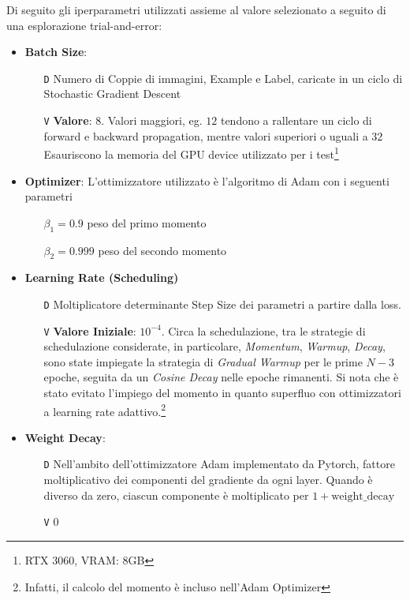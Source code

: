 \documentclass[a4paper,10pt,twocolumn]{article}
\begin{document}
Di seguito gli iperparametri utilizzati assieme al valore selezionato a seguito di una esplorazione trial-and-error:
\begin{itemize}[topsep=5pt, itemsep=7pt]
  \item \textbf{Batch Size}:
    \begin{itemize}[topsep=0pt, noitemsep]
      \item[\texttt{D}] Numero di Coppie di immagini, Example e Label, caricate in un ciclo di Stochastic Gradient Descent
      \item[\texttt{V}] \textbf{Valore}: $8$. Valori maggiori, eg. $12$ tendono a rallentare un ciclo di forward e backward propagation,
        mentre valori superiori o uguali a $32$ Esauriscono la
        memoria del GPU device utilizzato per i test\footnote{RTX 3060, VRAM: 8GB}
    \end{itemize}

  \item
    \textbf{Optimizer}: L'ottimizzatore utilizzato \`e l'algoritmo di Adam\cite{kingma2017adammethodstochasticoptimization} con i seguenti parametri
    \begin{itemize}[topsep=0pt, noitemsep]
      \item[] $\beta_1 = 0.9$ peso del primo momento
      \item[] $\beta_2 = 0.999$ peso del secondo momento
    \end{itemize}

  \item
    \textbf{Learning Rate (Scheduling)}
    \begin{itemize}[topsep=0pt, noitemsep]
      \item[\texttt{D}] Moltiplicatore determinante Step Size dei parametri a partire dalla loss.
      \item[\texttt{V}] \textbf{Valore Iniziale}: $10^{-4}$. Circa la schedulazione, tra le strategie di schedulazione considerate,
        in particolare, \textit{Momentum}, \textit{Warmup}, \textit{Decay}, sono state impiegate la strategia di \textit{Gradual Warmup}
        per le prime $N - 3$ epoche, seguita da un \textit{Cosine Decay} nelle
        epoche rimanenti. Si nota che \`e stato evitato l'impiego del momento in quanto superfluo con ottimizzatori a learning
        rate adattivo.\footnote{Infatti, il calcolo del momento \`e incluso nell'Adam Optimizer}
    \end{itemize}

  \item
    \textbf{Weight Decay}:
    \begin{itemize}[topsep=0pt, noitemsep]
      \item[\texttt{D}] Nell'ambito dell'ottimizzatore Adam implementato da Pytorch, fattore moltiplicativo dei componenti del gradiente da
        ogni layer.  Quando \`e diverso da zero, ciascun componente \`e moltiplicato per $1 + \mathrm{weight\_decay}$
      \item[\texttt{V}] $0$
    \end{itemize}


\end{itemize}
\end{document}

